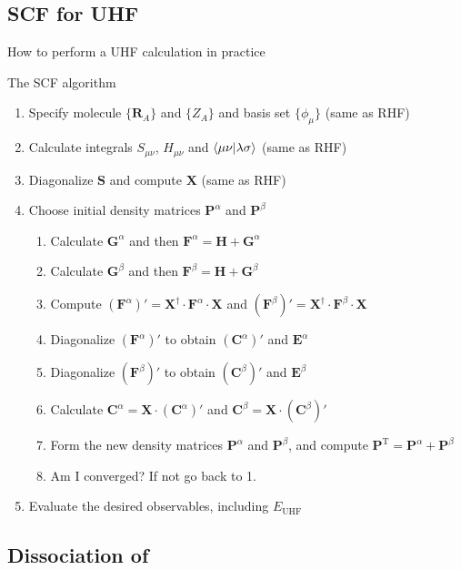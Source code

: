 \documentclass[aspectratio=169,9pt]{beamer}
\newcommand{\bR}{\boldsymbol{R}}
\newcommand{\bC}{\boldsymbol{C}}
\newcommand{\bE}{\boldsymbol{E}}
\newcommand{\bG}{\boldsymbol{G}}
\newcommand{\bP}{\boldsymbol{P}}
\newcommand{\bS}{\boldsymbol{S}}
\newcommand{\bF}{\boldsymbol{F}}
\newcommand{\bH}{\boldsymbol{H}}
\newcommand{\bX}{\boldsymbol{X}}
\begin{document}
\subsection{SCF for UHF}
\begin{frame}{How to perform a UHF calculation in practice}
	\begin{block}{The SCF algorithm}
		\begin{enumerate}
			\item \alert{Specify molecule} $\{\bR_A\}$ and $\{Z_A\}$ and \alert{basis set} $\{\phi_\mu\}$ \alert{(same as RHF)}
			\item Calculate integrals $S_{\mu \nu}$, $H_{\mu \nu}$ and $\braket{ \mu \nu }{ \lambda \sigma }$ \alert{(same as RHF)}
			\item Diagonalize $\bS$ and compute $\bX$ \alert{(same as RHF)}
			\item Choose \alert{initial density matrices} $\bP^\alpha$ and $\bP^\beta$
			\begin{enumerate}
				\item[1a.] Calculate $\bG^\alpha$ and then $\bF^\alpha = \bH + \bG^\alpha$
				\item[1b.] Calculate $\bG^\beta$ and then $\bF^\beta = \bH + \bG^\beta$
				\item[2.] Compute $(\bF^\alpha)' = \bX^\dag \cdot  \bF^\alpha \cdot \bX$ and $(\bF^\beta)' = \bX^\dag \cdot  \bF^\beta \cdot \bX$
				\item[3a.] Diagonalize $(\bF^\alpha)'$ to obtain $(\bC^\alpha)'$ and $\bE^\alpha$
				\item[3b.] Diagonalize $(\bF^\beta)'$ to obtain $(\bC^\beta)'$ and $\bE^\beta$
				\item[4.] Calculate $\bC^\alpha= \bX \cdot (\bC^\alpha)'$ and  $\bC^\beta= \bX \cdot (\bC^\beta)'$
				\item[5.] Form the \alert{new density matrices} $\bP^\alpha$ and $\bP^\beta$, and compute $\bP^\text{T} = \bP^\alpha + \bP^\beta$
				\item[6.] \alert{Am I converged?} If not go back to 1.
			\end{enumerate}
			\item Evaluate the desired observables, including $E_\text{UHF}$
		\end{enumerate}
	\end{block}
\end{frame}

\subsection{Dissociation of }
\end{document}
